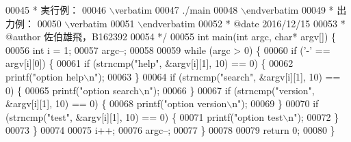 \begin{DoxyCode}
00045 \textcolor{comment}{ *  実行例：}
00046 \textcolor{comment}{\(\backslash\)verbatim}
00047 \textcolor{comment}{./main}
00048 \textcolor{comment}{\(\backslash\)endverbatim}
00049 \textcolor{comment}{  *  出力例：}
00050 \textcolor{comment}{\(\backslash\)verbatim}
00051 \textcolor{comment}{\(\backslash\)endverbatim}
00052 \textcolor{comment}{ *  @date   2016/12/15}
00053 \textcolor{comment}{ *  @author 佐伯雄飛，B162392}
00054 \textcolor{comment}{ */}
00055 \textcolor{keywordtype}{int} main(\textcolor{keywordtype}{int} argc, \textcolor{keywordtype}{char}* argv[]) \{
00056   \textcolor{keywordtype}{int} i = 1;
00057   argc--;
00058 
00059   \textcolor{keywordflow}{while} (argc > 0) \{
00060     \textcolor{keywordflow}{if} (\textcolor{charliteral}{'-'} == argv[i][0]) \{
00061       \textcolor{keywordflow}{if} (strncmp(\textcolor{stringliteral}{"help"}, &argv[i][1], 10) == 0) \{
00062         printf(\textcolor{stringliteral}{"option help\(\backslash\)n"});
00063       \}
00064       \textcolor{keywordflow}{if} (strncmp(\textcolor{stringliteral}{"search"}, &argv[i][1], 10) == 0) \{
00065         printf(\textcolor{stringliteral}{"option search\(\backslash\)n"});
00066       \}
00067       \textcolor{keywordflow}{if} (strncmp(\textcolor{stringliteral}{"version"}, &argv[i][1], 10) == 0) \{
00068         printf(\textcolor{stringliteral}{"option version\(\backslash\)n"});
00069       \}
00070       \textcolor{keywordflow}{if} (strncmp(\textcolor{stringliteral}{"test"}, &argv[i][1], 10) == 0) \{
00071         printf(\textcolor{stringliteral}{"option test\(\backslash\)n"});
00072       \}
00073     \}
00074 
00075     i++;
00076     argc--;
00077   \}
00078 
00079   \textcolor{keywordflow}{return} 0;
00080 \}
\end{DoxyCode}
